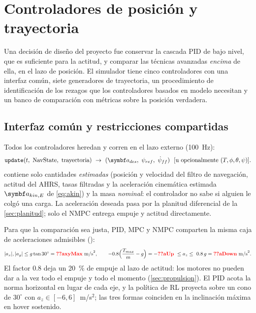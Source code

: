\section{Controladores de posición y trayectoria}
\label{sec:posicion}

Una decisión de diseño del proyecto fue conservar la cascada PID de bajo
nivel, que es suficiente para la actitud, y comparar las técnicas avanzadas
\emph{encima} de ella, en el lazo de posición. El simulador tiene cinco controladores con una interfaz común, siete
generadores de trayectoria, un procedimiento de identificación de los
rezagos que los controladores basados en modelo necesitan y un banco de
comparación con métricas sobre la posición verdadera.

\subsection{Interfaz común y restricciones compartidas}

Todos los controladores heredan  y corren en el lazo
externo (100~Hz):
\begin{equation}
\texttt{update}(t,\ \text{NavState},\ \text{trayectoria})\ \to\ (\vect a_{des},\ \psi_{ref},\ \dot\psi_{ff})\ \ [\text{u opcionalmente } (T,\phi,\theta,\psi)].
\end{equation}
 contiene solo cantidades \emph{estimadas} (posición y
velocidad del filtro de navegación, actitud del AHRS, tasas filtradas y la
aceleración cinemática estimada $\vect a_{kin,E}$ de \eqref{eq:akin}) y la
masa \emph{nominal}: el controlador no sabe si alguien le colgó una carga.
La aceleración deseada pasa por la planitud diferencial de la
\cref{sec:planitud}; solo el NMPC entrega empuje y actitud directamente.

Para que la comparación sea justa, PID, MPC y NMPC comparten la misma caja de
aceleraciones admisibles ():
\begin{equation}
|a_x|,|a_y|\le g\tan30^\circ=\val{axyMax}~\text{m/s}^2,\qquad
-0.8\Big(\frac{T_{max}}{m}-g\Big)=-\val{aUp}\ \le a_z\le\ 0.8\,g=\val{aDown}~\text{m/s}^2 .
\label{eq:caja}
\end{equation}
El factor 0.8 deja un 20~\% de empuje al lazo de actitud: los motores no
pueden dar a la vez todo el empuje y todo el momento (\cref{sec:propulsion}).
El PID acota la norma horizontal en lugar de cada eje, y la política de RL
proyecta sobre un cono de $30^\circ$ con $a_z\in[-6,6]$~m/s$^2$; las tres
formas coinciden en la inclinación máxima en hover sostenido.

